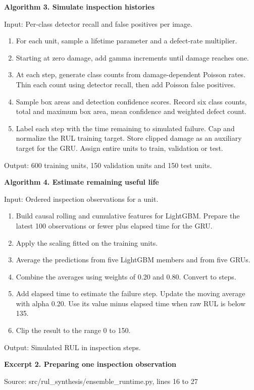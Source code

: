 \documentclass[conference]{IEEEtran}
\begin{document}
\noindent\textbf{Algorithm 3. Simulate inspection histories}\par
Input: Per-class detector recall and false positives per image.
\begin{enumerate}
\item For each unit, sample a lifetime parameter and a defect-rate multiplier.
\item Starting at zero damage, add gamma increments until damage reaches one.
\item At each step, generate class counts from damage-dependent Poisson rates.
  Thin each count using detector recall, then add Poisson false positives.
\item Sample box areas and detection confidence scores. Record six class counts,
  total and maximum box area, mean confidence and weighted defect count.
\item Label each step with the time remaining to simulated failure. Cap and
  normalize the RUL training target. Store clipped damage as an auxiliary
  target for the GRU. Assign entire units to train, validation or test.
\end{enumerate}
\noindent Output: 600 training units, 150 validation units and 150 test units.

\noindent\textbf{Algorithm 4. Estimate remaining useful life}\par
Input: Ordered inspection observations for a unit.
\begin{enumerate}
\item Build causal rolling and cumulative features for LightGBM. Prepare the
  latest 100 observations or fewer plus elapsed time for the GRU.
\item Apply the scaling fitted on the training units.
\item Average the predictions from five LightGBM members and from five GRUs.
\item Combine the averages using weights of 0.20 and 0.80. Convert to steps.
\item Add elapsed time to estimate the failure step. Update the moving average
  with alpha 0.20. Use its value minus elapsed time when raw RUL is below 135.
\item Clip the result to the range 0 to 150.
\end{enumerate}
\noindent Output: Simulated RUL in inspection steps.

\textbf{Excerpt 2. Preparing one inspection observation}

Source: src/rul\_synthesis/ensemble\_runtime.py, lines 16 to 27
\end{document}
